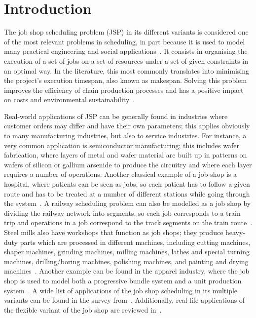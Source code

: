 \documentclass[icae]{iosart2x}
\newcommand{\reviewed}[1]{#1} %
\begin{document}



\section{Introduction}\label{SecIntro}
The job shop scheduling problem (JSP) in its different variants is considered one of the most \reviewed{relevant problems} in scheduling, in part because it is used to model many practical engineering and social applications~\cite{Xiong2022}.  It consists in organising the execution of a set of jobs on a set of resources under a set of given constraints in an optimal way. In the literature, this most commonly translates into minimising the project's execution timespan, also known as makespan. Solving this problem improves the efficiency of chain production processes and has a positive impact on costs and environmental sustainability~\cite{Pinedo2016}.

\reviewed{Real-world applications of JSP can be generally found in industries where customer orders may differ and have their own parameters; this applies obviously to many manufacturing industries, but also to service industries. For instance, a very common application is semiconductor manufacturing; this includes wafer fabrication, where layers of metal and wafer material are built up in patterns on wafers of silicon or gallium arsenide to produce the circuitry and where each layer requires a number of operations. Another classical example of a job shop is a hospital, where patients can be seen as jobs, so each patient has to follow a given route and has to be treated at a number of different stations while going through the system~\cite{Pinedo2009}. A railway scheduling problem can also be modelled as a job shop by dividing the railway network into segments, so each job corresponds to a train trip and operations in a job correspond to the track segments on the train route~\cite{Brucker2007job}. Steel mills also have workshops that function as job shops; they produce heavy-duty parts which are processed in different machines, including cutting machines, shaper machines, grinding machines, milling machines, lathes and special turning machines, drilling/boring machines, polishing machines,  and painting and drying machines~\cite{Meeran2012}.  Another example can be found in the apparel industry,  where the job shop is used to model both a progressive bundle system and a unit production system~\cite{Guo2006mathematical}. A wide list of applications of the job shop scheduling in its multiple variants can be found in the survey from~\cite{Xiong2022}. Additionally, real-life applications of the flexible variant of the job shop are reviewed in~\cite{Xie2019}.}
\end{document}
